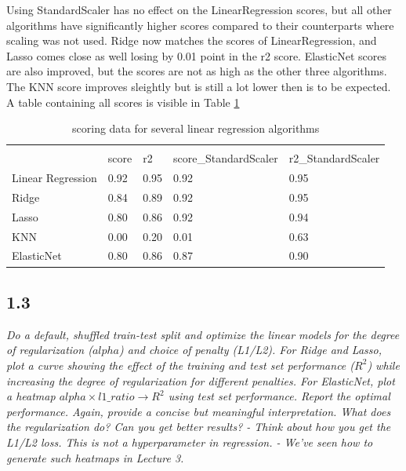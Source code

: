 Using StandardScaler has no effect on the LinearRegression scores, but all other algorithms have significantly higher scores compared to their counterparts where scaling was not used. Ridge now matches the scores of LinearRegression, and Lasso comes close as well losing by 0.01 point in the r2 score. ElasticNet scores are also improved, but the scores are not as high as the other three algorithms. The KNN score improves sleightly but is still a lot lower then is to be expected. \\

A table containing all scores is visible in Table \ref{table:score_table}

\begin{table}[]
\centering
\caption{scoring data for several linear regression algorithms}
\label{table:score_table}
\begin{tabular}{lllll}
                  &       &      &                       &                    \\
                  & score & r2   & score\_StandardScaler & r2\_StandardScaler \\
Linear Regression & 0.92  & 0.95 & 0.92                  & 0.95               \\
Ridge             & 0.84  & 0.89 & 0.92                  & 0.95               \\
Lasso             & 0.80  & 0.86 & 0.92                  & 0.94               \\
KNN               & 0.00  & 0.20 & 0.01                  & 0.63               \\
ElasticNet        & 0.80  & 0.86 & 0.87                  & 0.90              
\end{tabular}
\end{table}


\subsection{1.3}
{\it Do a default, shuffled train-test split and optimize the linear models for the degree of regularization ($alpha$) and choice of penalty (L1/L2). For Ridge and  Lasso, plot a curve showing the effect of the training and test set performance ($R^2$) while increasing the degree of regularization for different penalties. For ElasticNet, plot a heatmap $alpha \times l1\_ratio \rightarrow R^2$ using test set performance.
Report the optimal performance. Again, provide a concise but meaningful interpretation. What does the regularization do? Can you get better results?
- Think about how you get the L1/L2 loss. This is not a hyperparameter in regression.
- We've seen how to generate such heatmaps in Lecture 3.} \\

